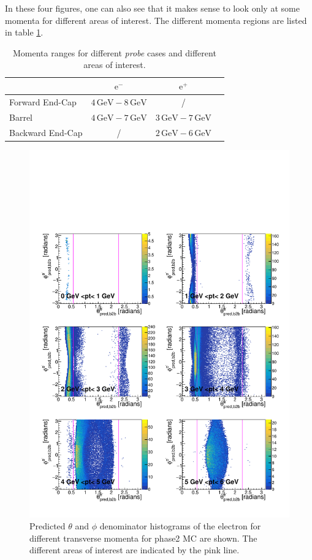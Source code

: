 \documentclass[a4paper,11pt,twosided,final,german,openbib,pdftex,listof=totoc,bibliography=totoc]{scrbook}
\begin{document}
In these four figures, one can also see that it makes sense to look only at some momenta for different areas of interest. The different momenta regions are listed in table \ref{tab:RTPMDTable}.


\begin{table}[h!]
	\centering
	\begin{tabular}{lccc}
		&$\textrm{e}^-$ &$\textrm{e}^+$\\
		\hline
		Forward End-Cap &$4\,\textrm{GeV} - 8\,\textrm{GeV}$&/\\
		Barrel &$4\,\textrm{GeV} - 7\,\textrm{GeV}$&$3\,\textrm{GeV} - 7\,\textrm{GeV}$\\
		Backward End-Cap & /&$2\,\textrm{GeV} - 6\,\textrm{GeV}$\\	
	\end{tabular}
	
	\caption[Areas Of Interest Different Momenta Ranges For Tracking Efficiency As Function Of $\phi$]{Momenta ranges for different \textit{probe} cases and different areas of interest.}
	\label{tab:RTPMDTable}
\end{table}

\begin{figure}[h!]
	\includegraphics[width=\textwidth]{Plots/master/RTPtMemD_MC.pdf}
	\caption[Denominator $\theta$-$\phi$ Electron Transverse Momentum MC]{Predicted $\theta$ and $\phi$ denominator histograms of the electron for different transverse momenta for phase2 MC are shown. The different areas of interest are indicated by the pink line.
}
	\label{plt:RTPtMemD_MC}
\end{figure}
\end{document}
